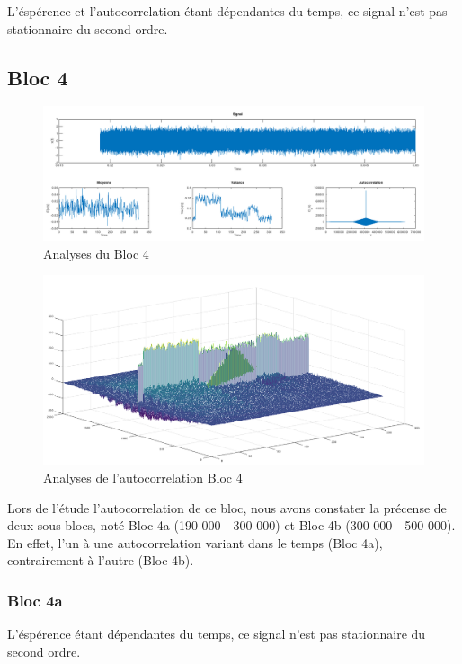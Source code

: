 \documentclass[french, a4paper, 12pt, openany]{book}
\begin{document}
	L'éspérence et l'autocorrelation étant dépendantes du temps, ce signal n'est pas stationnaire du second ordre.
  \subsection{Bloc 4}

	\begin{figure}[ht]
    \begin{center}
    \includegraphics[scale=0.25]{images/SignalBloc4.png}
    \end{center}
    \caption{Analyses du Bloc 4}
    \label{Analyses du Bloc 4}
  \end{figure}

	\begin{figure}[ht]
		\begin{center}
		\includegraphics[scale=0.25]{images/AutoCorrBloc4.png}
		\end{center}
		\caption{Analyses de l'autocorrelation Bloc 4}
		\label{Analyses de l'autocorrelation Bloc 4}
	\end{figure}

	Lors de l'étude l'autocorrelation de ce bloc, nous avons constater la précense de deux sous-blocs, noté Bloc 4a (190 000 - 300 000) et Bloc 4b (300 000 - 500 000). En effet, l'un à une autocorrelation variant dans le temps (Bloc 4a), contrairement à l'autre (Bloc 4b).

	\subsubsection{Bloc 4a}
	L'éspérence étant dépendantes du temps, ce signal n'est pas stationnaire du second ordre.
\end{document}
